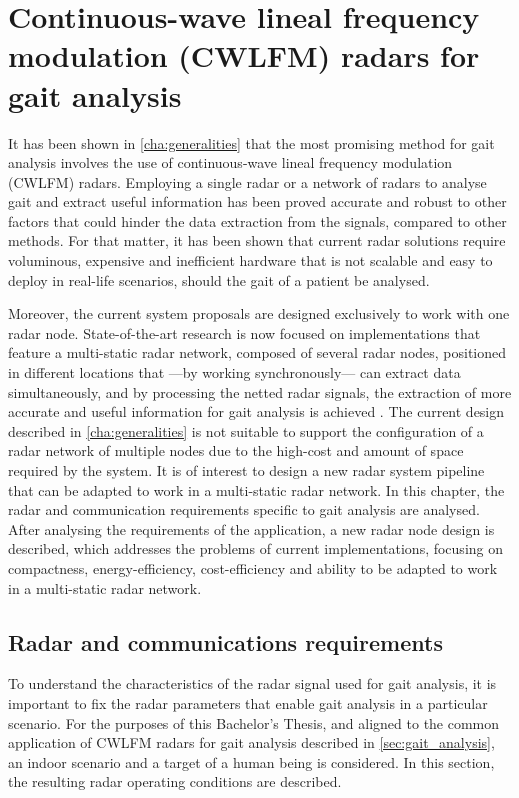 \chapter{Continuous-wave lineal frequency modulation (CWLFM) radars for gait analysis}\label{sec:continuous-wave-lineal-frequency-modulation-cwlfm-radars-for-gait-analysis}

It has been shown in \cref{cha:generalities} that the most promising method for gait analysis involves the use of continuous-wave lineal frequency modulation (CWLFM) radars. Employing a single radar or a network of radars to analyse gait and extract useful information has been proved accurate and robust to other factors that could hinder the data extraction from the signals, compared to other methods. For that matter, it has been shown that current radar solutions require voluminous, expensive and inefficient hardware that is not scalable and easy to deploy in real-life scenarios, should the gait of a patient be analysed.

Moreover, the current system proposals are designed exclusively to work with one radar node. State-of-the-art research is now focused on implementations that feature a multi-static radar network, composed of several radar nodes, positioned in different locations that ---by working synchronously--- can extract data simultaneously, and by processing the netted radar signals, the extraction of more accurate and useful information for gait analysis is achieved \cite{Amin2017}. The current design described in \cref{cha:generalities} is not suitable to support the configuration of a radar network of multiple nodes due to the high-cost and amount of space required by the system. It is of interest to design a new radar system pipeline that can be adapted to work in a multi-static radar network. In this chapter, the radar and communication requirements specific to gait analysis are analysed. After analysing the requirements of the application, a new radar node design is described, which addresses the problems of current implementations, focusing on compactness, energy-efficiency, cost-efficiency and ability to be adapted to work in a multi-static radar network.

\section{Radar and communications requirements}

To understand the characteristics of the radar signal used for gait analysis, it is important to fix the radar parameters that enable gait analysis in a particular scenario. For the purposes of this Bachelor's Thesis, and aligned to the common application of CWLFM radars for gait analysis described in \cref{sec:gait_analysis}, an indoor scenario and a target of a human being is considered. In this section, the resulting radar operating conditions are described.

